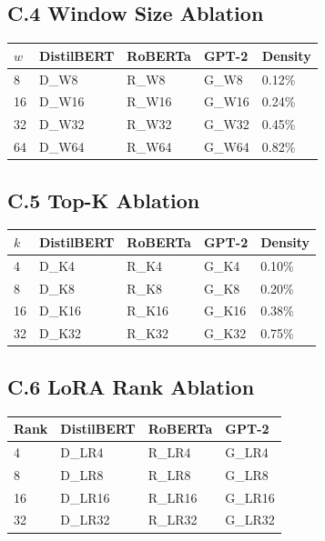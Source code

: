 \subsection{C.4 Window Size Ablation}

\begin{table}[H]
\centering
\small
\begin{tabular}{lllll}
\toprule
\textbf{$w$} & \textbf{DistilBERT} & \textbf{RoBERTa} & \textbf{GPT-2} & \textbf{Density} \\
\midrule
8 & {{D\_W8}} & {{R\_W8}} & {{G\_W8}} & 0.12\% \\
16 & {{D\_W16}} & {{R\_W16}} & {{G\_W16}} & 0.24\% \\
32 & {{D\_W32}} & {{R\_W32}} & {{G\_W32}} & 0.45\% \\
64 & {{D\_W64}} & {{R\_W64}} & {{G\_W64}} & 0.82\% \\
\bottomrule
\end{tabular}
\end{table}

\subsection{C.5 Top-K Ablation}

\begin{table}[H]
\centering
\small
\begin{tabular}{lllll}
\toprule
\textbf{$k$} & \textbf{DistilBERT} & \textbf{RoBERTa} & \textbf{GPT-2} & \textbf{Density} \\
\midrule
4 & {{D\_K4}} & {{R\_K4}} & {{G\_K4}} & 0.10\% \\
8 & {{D\_K8}} & {{R\_K8}} & {{G\_K8}} & 0.20\% \\
16 & {{D\_K16}} & {{R\_K16}} & {{G\_K16}} & 0.38\% \\
32 & {{D\_K32}} & {{R\_K32}} & {{G\_K32}} & 0.75\% \\
\bottomrule
\end{tabular}
\end{table}

\subsection{C.6 LoRA Rank Ablation}

\begin{table}[H]
\centering
\small
\begin{tabular}{llll}
\toprule
\textbf{Rank} & \textbf{DistilBERT} & \textbf{RoBERTa} & \textbf{GPT-2} \\
\midrule
4 & {{D\_LR4}} & {{R\_LR4}} & {{G\_LR4}} \\
8 & {{D\_LR8}} & {{R\_LR8}} & {{G\_LR8}} \\
16 & {{D\_LR16}} & {{R\_LR16}} & {{G\_LR16}} \\
32 & {{D\_LR32}} & {{R\_LR32}} & {{G\_LR32}} \\
\bottomrule
\end{tabular}
\end{table}

